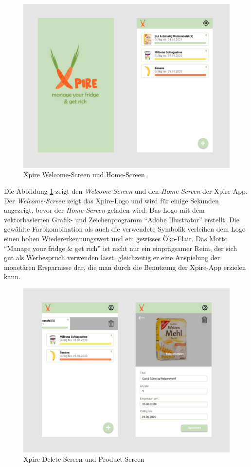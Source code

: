 \begin{figure}[hbt!]
	\centering
	\includegraphics[width=1.0\textwidth]{img/Prototype_01.pdf}
	\caption{Xpire Welcome-Screen und Home-Screen}
	\label{fig:prot1}
\end{figure}
Die Abbildung \ref{fig:prot1} zeigt den \textit{Welcome-Screen} und den \textit{Home-Screen} der Xpire-App. Der \textit{Welcome-Screen} zeigt das Xpire-Logo und wird für einige Sekunden angezeigt, bevor der \textit{Home-Screen} geladen wird. Das Logo mit dem vektorbasierten Grafik- und Zeichenprogramm \enquote{Adobe Illustrator} erstellt. Die gewählte Farbkombination als auch die verwendete Symbolik verleihen dem Logo einen hohen Wiedererkennungswert und ein gewisses Öko-Flair. Das Motto \enquote{Manage your fridge \& get rich} ist nicht nur ein einprägsamer Reim, der sich gut als Werbespruch verwenden lässt, gleichzeitig er eine Anspielung der monetären Ersparnisse dar, die man durch die Benutzung der Xpire-App erzielen kann. 


\begin{figure} 
	\centering
	\includegraphics[width=1.0\textwidth]{img/Prototpye_02.pdf}
	\caption{Xpire Delete-Screen und Product-Screen}
	\label{fig:prot2}
\end{figure}
